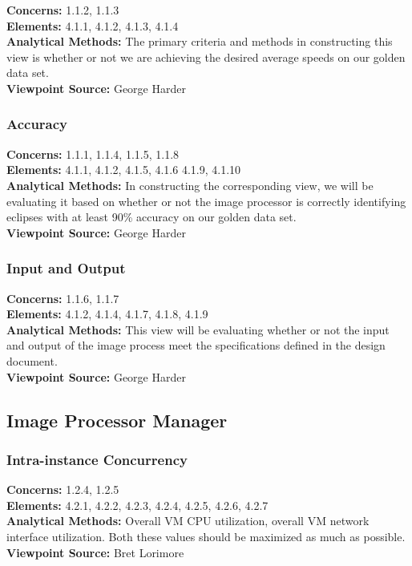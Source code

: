 \documentclass[10pt, onecolumn, draftclsnofoot, letterpaper, compsoc]{IEEEtran}
\begin{document}
\textbf{Concerns:} 1.1.2, 1.1.3 \\
\textbf{Elements:} 4.1.1, 4.1.2, 4.1.3, 4.1.4\\
\textbf{Analytical Methods:} The primary criteria and methods in constructing
this view is whether or not we are achieving the desired average speeds on our
golden data set. \\
\textbf{Viewpoint Source:} George Harder \\

\subsubsection{Accuracy}

\textbf{Concerns:} 1.1.1, 1.1.4, 1.1.5, 1.1.8 \\
\textbf{Elements:} 4.1.1, 4.1.2, 4.1.5, 4.1.6 4.1.9, 4.1.10\\
\textbf{Analytical Methods:}  In constructing the corresponding view, we will be
evaluating it based on whether or not the image processor is correctly
identifying eclipses with at least 90\% accuracy on our golden data set.\\
\textbf{Viewpoint Source:} George Harder \\

\subsubsection{Input and Output}

\textbf{Concerns:} 1.1.6, 1.1.7 \\
\textbf{Elements:} 4.1.2, 4.1.4, 4.1.7, 4.1.8, 4.1.9\\
\textbf{Analytical Methods:} This view will be evaluating whether or not the
input and output of the image process meet the specifications defined in the
design document. \\
\textbf{Viewpoint Source:} George Harder\\

\subsection{Image Processor Manager}

    \subsubsection{Intra-instance Concurrency}
    \textbf{Concerns:} 1.2.4, 1.2.5 \\
    \textbf{Elements:} 4.2.1, 4.2.2, 4.2.3, 4.2.4, 4.2.5, 4.2.6, 4.2.7 \\
    \textbf{Analytical Methods:} Overall VM CPU utilization, overall VM network interface utilization.
    Both these values should be maximized as much as possible. \\
    \textbf{Viewpoint Source:} Bret Lorimore \\
\end{document}
